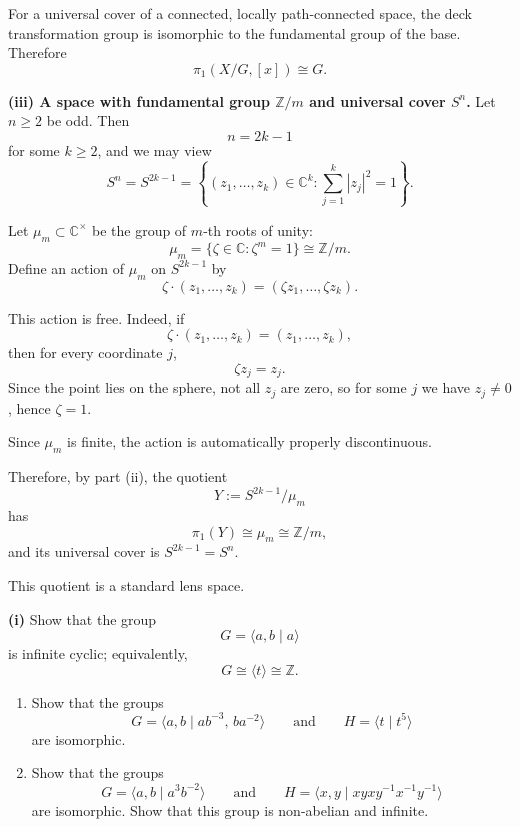 \begin{solution}
For a universal cover of a connected, locally path-connected space, the deck transformation group is isomorphic to the fundamental group of the base. Therefore
\[
\pi_1(X/G,[x])\cong G.
\]

\textbf{(iii) A space with fundamental group \(\mathbb{Z}/m\) and universal cover \(S^n\).}
Let \(n\ge 2\) be odd. Then
\[
n=2k-1
\]
for some \(k\ge 2\), and we may view
\[
S^n=S^{2k-1}=\left\{(z_1,\dots,z_k)\in \mathbb{C}^k:\sum_{j=1}^k |z_j|^2=1\right\}.
\]

Let \(\mu_m\subset \mathbb{C}^\times\) be the group of \(m\)-th roots of unity:
\[
\mu_m=\{\zeta\in\mathbb{C}:\zeta^m=1\}\cong \mathbb{Z}/m.
\]
Define an action of \(\mu_m\) on \(S^{2k-1}\) by
\[
\zeta\cdot (z_1,\dots,z_k)=(\zeta z_1,\dots,\zeta z_k).
\]

This action is free. Indeed, if
\[
\zeta\cdot (z_1,\dots,z_k)=(z_1,\dots,z_k),
\]
then for every coordinate \(j\),
\[
\zeta z_j=z_j.
\]
Since the point lies on the sphere, not all \(z_j\) are zero, so for some \(j\) we have \(z_j\neq 0\), hence \(\zeta=1\).

Since \(\mu_m\) is finite, the action is automatically properly discontinuous.

Therefore, by part (ii), the quotient
\[
Y:=S^{2k-1}/\mu_m
\]
has
\[
\pi_1(Y)\cong \mu_m\cong \mathbb{Z}/m,
\]
and its universal cover is \(S^{2k-1}=S^n\).

This quotient is a standard lens space.
\end{solution}

\begin{problem}
\noindent\textbf{(i)} Show that the group
\[
G=\langle a,b\mid a\rangle
\]
is infinite cyclic; equivalently,
\[
G\cong \langle t\rangle\cong\mathbb Z.
\]

\begin{enumerate}
	\item[(ii)] Show that the groups
	\[
	G=\langle a,b\mid ab^{-3},\,ba^{-2}\rangle
	\qquad\text{and}\qquad
	H=\langle t\mid t^5\rangle
	\]
	are isomorphic.

	\item[(iii)] Show that the groups
	\[
	G=\langle a,b\mid a^3b^{-2}\rangle
	\qquad\text{and}\qquad
	H=\langle x,y\mid xyxy^{-1}x^{-1}y^{-1}\rangle
	\]
	are isomorphic. Show that this group is non-abelian and infinite.
\end{enumerate}
\end{problem}

